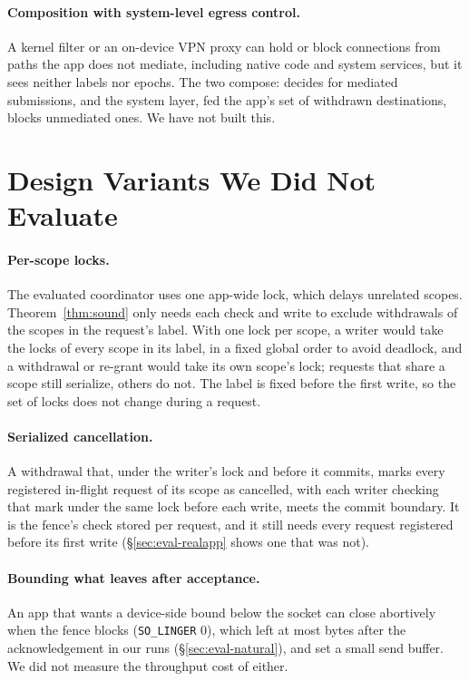 \paragraph{Composition with system-level egress control.} A kernel filter or an on-device VPN proxy can hold or block
connections from paths the app does not mediate, including native code and system services, but it sees neither
labels nor epochs. The two compose: \sys decides for mediated submissions, and the system layer, fed the app's set of
withdrawn destinations, blocks unmediated ones. We have not built this.

\section{Design Variants We Did Not Evaluate}
\label{app:variants}
\paragraph{Per-scope locks.} The evaluated coordinator uses one app-wide lock, which delays unrelated scopes. Theorem~\ref{thm:sound}
only needs each check and write to exclude withdrawals of the scopes in the request's label. With one lock per scope, a
writer would take the locks of every scope in its label, in a fixed global order to avoid deadlock, and a withdrawal or
re-grant would take its own scope's lock; requests that share a scope still serialize, others do not. The label is fixed
before the first write, so the set of locks does not change during a request.

\paragraph{Serialized cancellation.} A withdrawal that, under the writer's lock and before it commits, marks every
registered in-flight request of its scope as cancelled, with each writer checking that mark under the same lock before
each write, meets the commit boundary. It is the fence's check stored per request, and it still needs every request
registered before its first write (\S\ref{sec:eval-realapp} shows one that was not).

\paragraph{Bounding what leaves after acceptance.} An app that wants a device-side bound below the socket can close
abortively when the fence blocks (\texttt{SO\_LINGER} 0), which left at most \gsAbortMax{} bytes after the acknowledgement in our runs
(\S\ref{sec:eval-natural}), and set a small send buffer. We did not measure the throughput cost of either.

